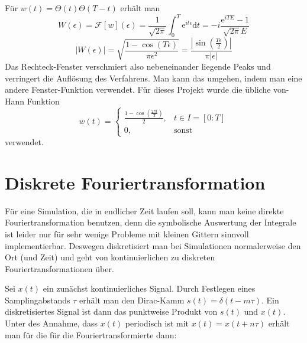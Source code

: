 \documentclass[10pt,a4paper,german]{scrartcl}
\begin{document}
		Für $w(t)=\Theta(t)\Theta(T-t)$ erhält man
		\begin{equation*}
			W(\epsilon) =\mathcal{F}[w](\epsilon) = 
				\frac{1}{\sqrt{2\pi}}\int_{0}^{T}	\mathrm{e}^{i t\epsilon} \mathrm{d}t
			= -i \frac{\mathrm{e}^{i T E}-1}{\sqrt{2\pi} E}
		\end{equation*}
		\begin{equation*}
			|W(\epsilon)| = \sqrt{\frac{1-\cos(T \epsilon)}{\pi \epsilon^2}}
			= \frac{|\sin(\frac{T \epsilon}{2})|}{\pi |\epsilon|}
		\end{equation*}
		Das Rechteck-Fenster verschmiert also nebeneinander  liegende Peaks und verringert
		die Auflösung des Verfahrens. Man kann das umgehen, indem man eine andere
		Fenster-Funktion verwendet. Für dieses Projekt wurde die übliche
		von-Hann Funktion  
		\begin{equation}
		\label{eq:hann}
			w(t) = \left\{\begin{array}{cl}
				\frac{1-\cos(\frac{2\pi t}{T})}{2}, & t \in I=[0:T]\\
				0,                        & \mbox{sonst} 
				\end{array}\right. 
		\end{equation}
		verwendet.
  
  \section{Diskrete Fouriertransformation}
		Für eine Simulation, die in endlicher Zeit laufen soll, kann man keine
		direkte Fouriertransformation benutzen, denn die symbolische Auswertung
		der Integrale ist leider nur für sehr wenige Probleme mit kleinen Gittern
		sinnvoll implementierbar. Deswegen diskretisiert man bei Simulationen
		normalerweise den Ort (und Zeit) und geht von kontinuierlichen zu diskreten
		Fouriertransformationen über.
		
		Sei $x(t)$ ein zunächst kontinuierliches Signal. Durch Festlegen eines
		Samplingabstands $\tau$ erhält man den Dirac-Kamm $s(t)=\delta(t-m \tau)$.
		Ein diskretisiertes Signal ist dann das punktweise Produkt von $s(t)$ und $x(t)$.
		Unter des Annahme, dass $x(t)$ periodisch ist mit $x(t)=x(t+n\tau)$ erhält
		man für die für die Fouriertransformierte dann:
		
\end{document}
